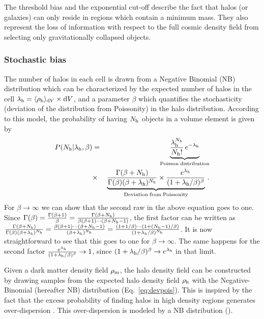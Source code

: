 \documentclass[english,usenatbib]{mn2e}
\newcommand{\ba}{\begin{eqnarray}}
\newcommand{\ea}{\end{eqnarray}}
\begin{document}
The threshold bias and the exponential cut-off describe the fact that halos (or galaxies) can only reside in regions which contain a minimum mass. They also represent the loss of information with respect to the full cosmic density field from selecting only gravitationally collapsed objects.


\subsubsection{Stochastic bias}

The number of halos in each cell is drawn from a Negative Binomial (NB) distribution which can be characterized by the expected number of halos in the cell $\lambda_{\rm h} = \langle \rho_{\rm h} \rangle_{{\rm d}V} \times {\rm d}V$, and a parameter $\beta$ which quantifies the stochasticity (deviation of the distribution from Poissonity) in the halo distribution. According to this model, the probability of having $N_{\rm h}$ objects in a volume element is given by
\ba
P(N_{\rm h}|\lambda_{\rm h}, \beta) &=& \underbrace{\frac{\lambda_{\rm h}^{N_{\rm h}}}{N_{\rm h}!}\, e^{-\lambda_{\rm h}}}_{\mathrm{Poisson\; distribution}} \nonumber \\ 
&\times& \underbrace{\frac{\Gamma(\beta+N_{\rm h})}{\Gamma(\beta)(\beta + \lambda_{\rm h})^{N_{\rm h}}}\times\frac{e^{\lambda_{\rm h}}}{(1+\lambda_{\rm h}/\beta)^{\beta}}}_{\mathrm{Deviation\; from\; Poissonity}}\,.
\label{eq:devpois}
\ea
For $\beta\rightarrow\infty$ we can show that the second raw in the above equation goes to one. Since $\Gamma(\beta)=\frac{\Gamma(\beta+1)}{\beta}=\frac{\Gamma(\beta+N_{\rm h})}{\beta(\beta+1)\cdots(\beta+N_{\rm h}-1)}$, the first factor can be written as $\frac{\Gamma(\beta+N_{\rm h})}{\Gamma(\beta)(\beta + \lambda_{\rm h})^{N_{\rm h}}}=\frac{\beta(\beta+1)\cdots(\beta+N_{\rm h}-1)}{(\beta + \lambda_{\rm h})^{N_{\rm h}}}=\frac{(1+1/\beta)\cdots(1+(N_{\rm h}-1)/\beta)}{(1 + \lambda_{\rm h}/\beta)^{N_{\rm h}}}$. It is now straightforward to see that this goes to one for $\beta\rightarrow\infty$. The same happens for the second factor $\frac{e^{\lambda_{\rm h}}}{(1+\lambda_{\rm h}/\beta)^{\beta}}\rightarrow 1$, since $(1+\lambda_{\rm h}/\beta)^{\beta}\rightarrow e^{\lambda_{\rm h}}$ in that limit.

Given a dark matter density field $\rho_{\rm m}$, the halo density field can be constructed by drawing samples from the expected halo density field $\rho_{\rm h}$ with the Negative-Binomial (hereafter NB) distribution (Eq.~\ref{eq:devpois}). This is inspired by the fact that the excess probability of finding halos in high density regions generates over-dispersion \citep[][]{somerville2001,miranda2002}. This over-dispersion is modeled by a NB distribution (\citealt{kitaura2014,neyrinck2014}). 
\end{document}
